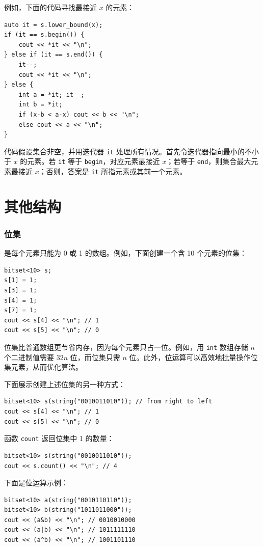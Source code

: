 \begin{samepage}
例如，下面的代码寻找最接近 $x$ 的元素：

\begin{lstlisting}
auto it = s.lower_bound(x);
if (it == s.begin()) {
    cout << *it << "\n";
} else if (it == s.end()) {
    it--;
    cout << *it << "\n";
} else {
    int a = *it; it--;
    int b = *it;
    if (x-b < a-x) cout << b << "\n";
    else cout << a << "\n";
}
\end{lstlisting}

代码假设集合非空，并用迭代器 \texttt{it} 处理所有情况。首先令迭代器指向最小的不小于 $x$ 的元素。若 \texttt{it} 等于 \texttt{begin}，对应元素最接近 $x$；若等于 \texttt{end}，则集合最大元素最接近 $x$；否则，答案是 \texttt{it} 所指元素或其前一个元素。
\end{samepage}

\section{其他结构}

\subsubsection{位集}


是每个元素只能为 0 或 1 的数组。例如，下面创建一个含 10 个元素的位集：
\begin{lstlisting}
bitset<10> s;
s[1] = 1;
s[3] = 1;
s[4] = 1;
s[7] = 1;
cout << s[4] << "\n"; // 1
cout << s[5] << "\n"; // 0
\end{lstlisting}

位集比普通数组更节省内存，因为每个元素只占一位。例如，用 \texttt{int} 数组存储 $n$ 个二进制值需要 $32n$ 位，而位集只需 $n$ 位。此外，位运算可以高效地批量操作位集元素，从而优化算法。

下面展示创建上述位集的另一种方式：
\begin{lstlisting}
bitset<10> s(string("0010011010")); // from right to left
cout << s[4] << "\n"; // 1
cout << s[5] << "\n"; // 0
\end{lstlisting}

函数 \texttt{count} 返回位集中 1 的数量：

\begin{lstlisting}
bitset<10> s(string("0010011010"));
cout << s.count() << "\n"; // 4
\end{lstlisting}

下面是位运算示例：
\begin{lstlisting}
bitset<10> a(string("0010110110"));
bitset<10> b(string("1011011000"));
cout << (a&b) << "\n"; // 0010010000
cout << (a|b) << "\n"; // 1011111110
cout << (a^b) << "\n"; // 1001101110
\end{lstlisting}

